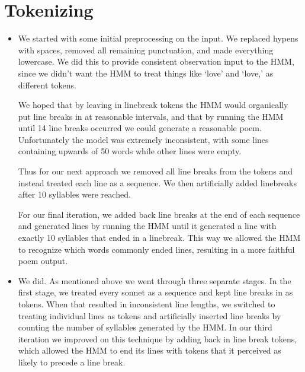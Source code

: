 \section{Tokenizing}
\medskip
\begin{itemize}


    \item {}

    We started with some initial preprocessing on the input. We replaced hypens with
    spaces, removed all remaining punctuation, and made everything lowercase.
    We did this to provide consistent observation input to the HMM, since we didn't
    want the HMM to treat things like `love' and `love,' as different tokens.

    We hoped that by leaving in linebreak tokens the HMM would organically put
    line breaks in at reasonable intervals, and that by running the HMM until 14
    line breaks occurred we could generate a reasonable poem. Unfortunately the
    model was extremely inconsistent, with some lines containing upwards of 50
    words while other lines were empty.

    Thus for our next approach we removed all line breaks from the tokens and
    instead treated each line as a sequence. We then artificially added linebreaks
    after 10 syllables were reached.

    For our final iteration, we added back line breaks at the end of each sequence
    and generated lines by running the HMM until it generated a line with exactly
    10 syllables that ended in a linebreak. This way we allowed the HMM to recognize
    which words commonly ended lines, resulting in a more faithful poem output.


    \item {}

    We did. As mentioned above we went through three separate stages. In the first
    stage, we treated every sonnet as a sequence and kept line breaks in as tokens.
    When that resulted in inconsistent line lengths, we switched to treating
    individual lines as tokens and artificially inserted line breaks by counting
    the number of syllables generated by the HMM. In our third iteration we
    improved on this technique by adding back in line break tokens, which allowed
    the HMM to end its lines with tokens that it perceived as likely to
    precede a line break.

\end{itemize}




